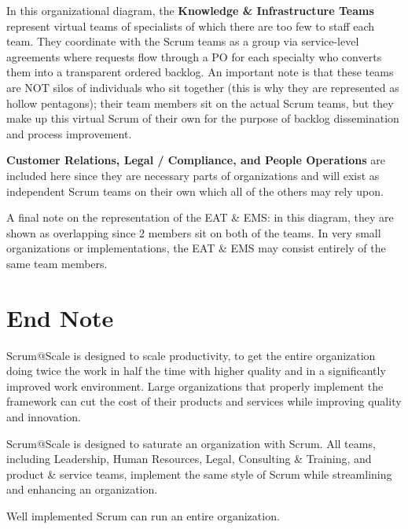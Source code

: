 \documentclass[12pt,a4paper,parskip=full]{scrartcl}
\begin{document}
In this organizational diagram, the \textbf{Knowledge \& Infrastructure
Teams} represent virtual teams of specialists of which there are too few to
staff each team. They coordinate with the Scrum teams as a group via
service-level agreements where requests flow through a PO for each
specialty who converts them into a transparent ordered backlog. An
important note is that these teams are NOT silos of individuals who sit
together (this is why they are represented as hollow pentagons); their team
members sit on the actual Scrum teams, but they make up this virtual Scrum
of their own for the purpose of backlog dissemination and process
improvement.

\textbf{Customer Relations, Legal / Compliance, and People Operations} are
included here since they are necessary parts of organizations and will
exist as independent Scrum teams on their own which all of the others may
rely upon.

A final note on the representation of the EAT \& EMS: in this diagram, they
are shown as overlapping since 2 members sit on both of the teams. In very
small organizations or implementations, the EAT \& EMS may consist entirely
of the same team members.

\section{End Note}
Scrum@Scale is designed to scale productivity, to get the entire
organization doing twice the work in half the time with higher quality and
in a significantly improved work environment. Large organizations that
properly implement the framework can cut the cost of their products and
services while improving quality and innovation.

Scrum@Scale is designed to saturate an organization with Scrum. All teams,
including Leadership, Human Resources, Legal, Consulting \& Training, and
product \& service teams, implement the same style of Scrum while
streamlining and enhancing an organization.

Well implemented Scrum can run an entire organization.
\end{document}
